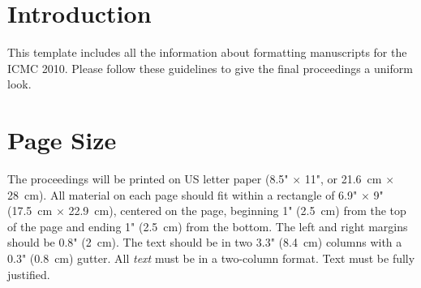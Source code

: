 \documentclass[twoside,10pt]{article}
\affiliation{}{}
\title{\papertitle}
\begin{document}
    
\maketitle



\begin{abstract}

This paper presents an object-oriented, reflective, application programming interface for C++, with an emphasis on real-time signal processing. It makes use of polymorphic typing, dynamic binding, and introspection to create a cross-platform environment pulling ideas from languages such as Smalltalk and Objective-C while remaining within the bounds of the portable and cross-platform C++ context.  The Jamoma Foundation and DSP Library provide a flexible framework and runtime environment, as well as an expanding collection of unit generators for synthesis, processing, and analysis.  This library has been used in both open source and commercial software projects over the past seven years including Electrotap's Tap.Tools, Cycling '74's Hipno, and the Jamoma Modular Framework.

\end{abstract}



\section{Introduction}\label{sec:introduction}

This template includes all the information about formatting manuscripts
for the ICMC 2010. Please follow these guidelines to give the final
proceedings a uniform look. 

\section{Page Size}\label{sec:page_size}

The proceedings will be printed on US letter paper (8.5" $\times$ 11", or 21.6~cm $\times$ 28~cm). 
All material on each page should fit within a rectangle of 6.9" $\times$ 9" (17.5~cm $\times$ 22.9~cm), centered on the page, beginning 1" (2.5~cm) from the top of the page and ending 1" (2.5~cm) from the bottom.  
The left and right margins should be 0.8" (2~cm).
The text should be in two 3.3" (8.4~cm) columns with a 0.3" (0.8~cm) gutter. All {\it text} must be in a two-column format. Text must be fully justified.
\end{document}
